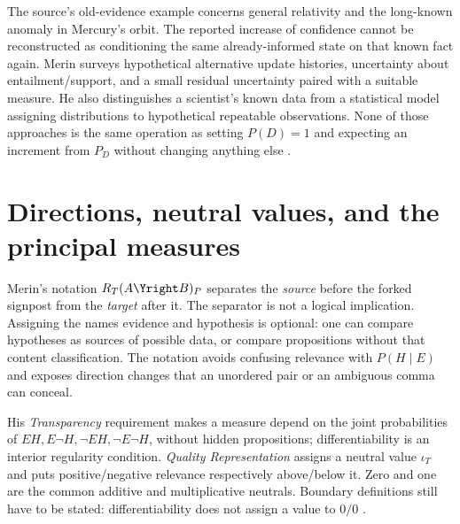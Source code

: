 The source's old-evidence example concerns general relativity and the
long-known anomaly in Mercury's orbit. The reported increase of confidence
cannot be reconstructed as conditioning the same already-informed
state on that known fact again. Merin surveys hypothetical alternative
update histories, uncertainty about entailment/support, and a small
residual uncertainty paired with a suitable measure. He also distinguishes
a scientist's known data from a statistical model assigning distributions
to hypothetical repeatable observations. None of those approaches is
the same operation as setting \(P(D)=1\) and expecting an increment
from \(P_D\) without changing anything else
\parencite[pp.~267--268 and p.~274, n.~5]{Merin2021Relevance}.

\section{Directions, neutral values, and the principal measures}
\label{sec:p15-r43-measures}

Merin's notation \(R_T(A\Yright B)_P\) separates the \emph{source}
before the forked signpost from the \emph{target} after it. The separator
is not a logical implication. Assigning the names evidence and hypothesis
is optional: one can compare hypotheses as sources of possible data,
or compare propositions without that content classification. The notation
avoids confusing relevance with \(P(H\mid E)\) and exposes direction
changes that an unordered pair or an ambiguous comma can conceal.

His \emph{Transparency} requirement makes a measure depend on the joint
probabilities of \(EH,E\neg H,\neg EH,\neg E\neg H\), without
hidden propositions; differentiability is an interior regularity
condition. \emph{Quality Representation} assigns a neutral value
\(\iota_T\) and puts positive/negative relevance respectively above/below
it. Zero and one are the common additive and multiplicative neutrals.
Boundary definitions still have to be stated: differentiability does
not assign a value to \(0/0\)
\parencite[pp.~268--269 and p.~274, nn.~6, 8--9]{Merin2021Relevance}.

